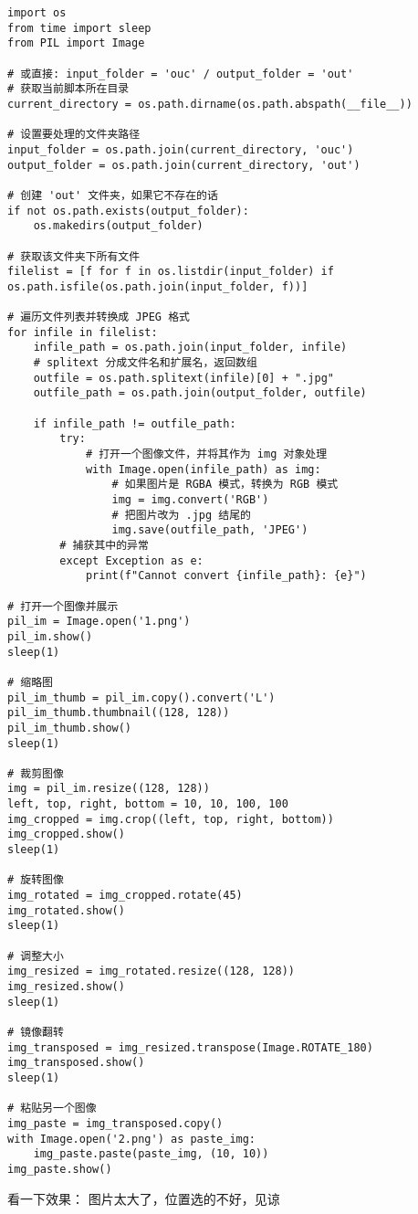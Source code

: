         \begin{verbatim}
import os
from time import sleep
from PIL import Image

# 或直接: input_folder = 'ouc' / output_folder = 'out'
# 获取当前脚本所在目录
current_directory = os.path.dirname(os.path.abspath(__file__))

# 设置要处理的文件夹路径
input_folder = os.path.join(current_directory, 'ouc')
output_folder = os.path.join(current_directory, 'out')

# 创建 'out' 文件夹，如果它不存在的话
if not os.path.exists(output_folder):
    os.makedirs(output_folder)

# 获取该文件夹下所有文件
filelist = [f for f in os.listdir(input_folder) if os.path.isfile(os.path.join(input_folder, f))]

# 遍历文件列表并转换成 JPEG 格式
for infile in filelist:
    infile_path = os.path.join(input_folder, infile)
    # splitext 分成文件名和扩展名，返回数组
    outfile = os.path.splitext(infile)[0] + ".jpg"
    outfile_path = os.path.join(output_folder, outfile)

    if infile_path != outfile_path:
        try:
            # 打开一个图像文件，并将其作为 img 对象处理
            with Image.open(infile_path) as img:
                # 如果图片是 RGBA 模式，转换为 RGB 模式
                img = img.convert('RGB')
                # 把图片改为 .jpg 结尾的
                img.save(outfile_path, 'JPEG')
        # 捕获其中的异常
        except Exception as e:
            print(f"Cannot convert {infile_path}: {e}")

# 打开一个图像并展示
pil_im = Image.open('1.png')
pil_im.show()
sleep(1)

# 缩略图
pil_im_thumb = pil_im.copy().convert('L')
pil_im_thumb.thumbnail((128, 128))
pil_im_thumb.show()
sleep(1)

# 裁剪图像
img = pil_im.resize((128, 128))
left, top, right, bottom = 10, 10, 100, 100
img_cropped = img.crop((left, top, right, bottom))
img_cropped.show()
sleep(1)

# 旋转图像
img_rotated = img_cropped.rotate(45)
img_rotated.show()
sleep(1)

# 调整大小
img_resized = img_rotated.resize((128, 128))
img_resized.show()
sleep(1)

# 镜像翻转
img_transposed = img_resized.transpose(Image.ROTATE_180)
img_transposed.show()
sleep(1)

# 粘贴另一个图像
img_paste = img_transposed.copy()
with Image.open('2.png') as paste_img:
    img_paste.paste(paste_img, (10, 10))
img_paste.show()
        \end{verbatim}

        \newpage
        看一下效果：
        图片太大了，位置选的不好，见谅